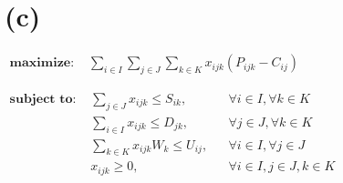 \newpage

\section*{(c)}

$
\begin{aligned}
    \textbf{maximize: } & \sum_{i \in I} \sum_{j \in J} \sum_{k \in K} x_{ijk} (P_{ijk} - C_{ij})
\end{aligned}
$

$
\begin{aligned}
    \textbf{subject to: }
    & \sum_{j \in J} x_{ijk} \leq S_{ik}, && \forall i \in I, \forall k \in K \\
    & \sum_{i \in I} x_{ijk} \leq D_{jk}, && \forall j \in J, \forall k \in K \\
    & \sum_{k \in K} x_{ijk} W_k \leq U_{ij}, && \forall i \in I, \forall j \in J \\
    & x_{ijk} \geq 0, && \forall i \in I, j \in J, k \in K
\end{aligned}
$